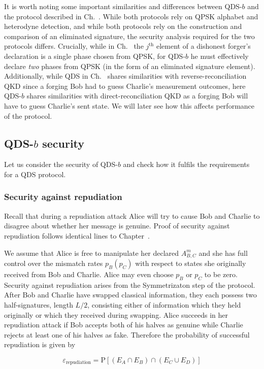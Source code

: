 It is worth noting some important similarities and differences between QDS-$b$ and the protocol described in Ch.~. While both protocols rely on QPSK alphabet and heterodyne detection, and while both protocols rely on the construction and comparison of an eliminated signature, the security analysis required for the two protocols differs. Crucially, while in Ch.~ the $j^{\text{th}}$ element of a dishonest forger's declaration is a single phase chosen from QPSK, for QDS-$b$ he must effectively declare \emph{two} phases from QPSK (in the form of an eliminated signature element). Additionally, while QDS in Ch.~ shares similarities with reverse-reconciliation QKD since a forging Bob had to guess Charlie's measurement outcomes, here QDS-$b$ shares similarities with direct-reconciliation QKD as a forging Bob will have to guess Charlie's sent state. We will later see how this affects performance of the protocol.

\subsection{QDS-$b$ security}
Let us consider the security of QDS-$b$ and check how it fulfils the requirements for a QDS protocol. 
\subsubsection{Security against repudiation}
Recall that during a repudiation attack Alice will try to cause Bob and Charlie to disagree about whether her message is genuine. Proof of security against repudiation follows identical lines to Chapter~.

We assume that Alice is free to manipulate her declared $A_{B, C}^m$ and she has full control over the mismatch rates $p_B \left(p_C\right)$ with respect to states she originally received from Bob and Charlie. Alice may even choose $p_B$ or $p_C$ to be zero. Security against repudiation arises from the Symmetrizaton step of the protocol. After Bob and Charlie have swapped classical information, they each possess two half-signatures, length $L/2$, consisting either of information which they held originally or which they received during swapping. Alice succeeds in her repudiation attack if Bob accepts both of his halves as genuine while Charlie rejects at least one of his halves as fake. Therefore the probability of successful repudiation is given by

\begin{equation}
\varepsilon_{\text{repudiation}} = \text{P}\left[\left(E_A \cap E_B\right) \cap \left(E_C \cup E_D\right) \right]
\end{equation}

